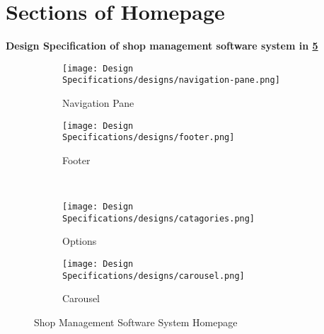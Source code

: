 \section{Sections of Homepage}
\vspace{2cm}
\textbf{Design Specification of shop management software system in \ref{fig:fig5.2}}\\
\begin{figure}[ht]
    \centering
    \begin{subfigure}[b]{0.4\textwidth}
        \centering
        \texttt{[image: Design Specifications/designs/navigation-pane.png]}
        \caption{Navigation Pane}
        \label{fig:5.2.1}
    \end{subfigure}
 \hfill
    \begin{subfigure}[b]{0.4\textwidth}
        \centering
        \texttt{[image: Design Specifications/designs/footer.png]}
        \caption{Footer}
        \label{fig:5.2.2}
    \end{subfigure}
\\[4ex]
    
   \begin{subfigure}[b]{0.4\textwidth}
        \centering
        \texttt{[image: Design Specifications/designs/catagories.png]}
        \caption{Options}
        \label{fig:5.2.3}
    \end{subfigure}
    \hfill
    \begin{subfigure}[b]{0.4\textwidth}
        \centering
        \texttt{[image: Design Specifications/designs/carousel.png]}
        \caption{Carousel}
        \label{fig:5.2.4}
    \end{subfigure}
    
    
    \caption{Shop Management Software System Homepage}
    \label{fig:fig5.2}
\end{figure}